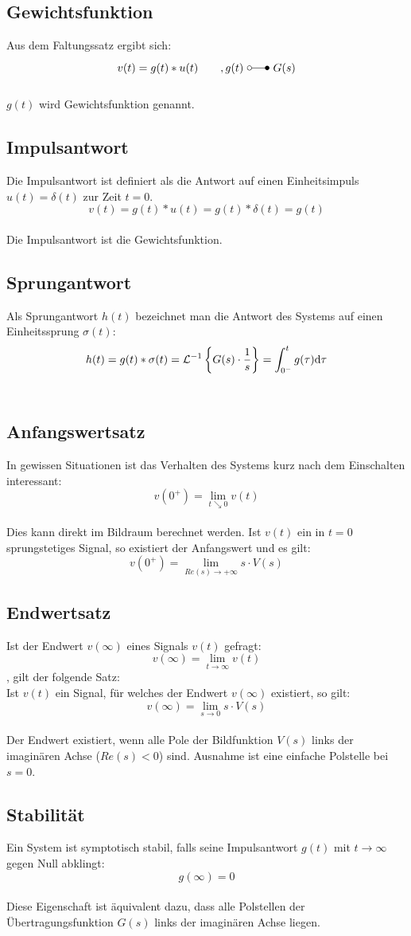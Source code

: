 \subsection{Gewichtsfunktion}
Aus dem Faltungssatz ergibt sich:
\[
	v(t) = g(t) \ast u(t) \qquad , g(t) \ \laplace \ G(s)
\]
\\
$g(t)$ wird Gewichtsfunktion genannt.
\\

\subsection{Impulsantwort}
Die Impulsantwort ist definiert als die Antwort auf einen Einheitsimpuls $u(t) = \delta(t)$ zur Zeit $t=0$.
\[
	v(t) = g(t) \ast u(t) = g(t) \ast \delta(t) = g(t)
\]
\\
Die Impulsantwort ist die Gewichtsfunktion.
\\

\subsection{Sprungantwort}
Als Sprungantwort $h(t)$ bezeichnet man die Antwort des Systems auf einen Einheitssprung $\sigma(t)$:
\[
	h(t) = g(t) \ast \sigma(t) = \mathcal{L}^{-1}\left\lbrace G(s) \cdot \frac{1}{s} \right\rbrace = \int_{0^-}^{t} g(\tau) \mathrm{d} \tau
\]
\\

\subsection{Anfangswertsatz}
In gewissen Situationen ist das Verhalten des Systems kurz nach dem Einschalten interessant:
\[
	v(0^+) = \lim\limits_{t \searrow 0}v(t)
\]
\\
Dies kann direkt im Bildraum berechnet werden. Ist $v(t)$ ein in $t=0$ sprungstetiges Signal, so existiert der Anfangswert und es gilt:
\[
	v(0^+) = \lim\limits_{Re(s)\rightarrow + \infty} s\cdot V(s)
\]

\subsection{Endwertsatz}
Ist der Endwert $v(\infty)$ eines Signals $v(t)$ gefragt:
\[
	v(\infty) = \lim\limits_{t \rightarrow \infty} v(t)
\]
, gilt der folgende Satz:\\
Ist $v(t)$ ein Signal, für welches der Endwert $v(\infty)$ existiert, so gilt:
\[
	v(\infty) = \lim\limits_{s \rightarrow 0} s \cdot V(s)
\]
\\
Der Endwert existiert, wenn alle Pole der Bildfunktion $V(s)$ links der imaginären Achse ($Re(s)<0$) sind. Ausnahme ist eine einfache Polstelle bei $s=0$.
\\

\subsection{Stabilität}
Ein System ist symptotisch stabil, falls seine Impulsantwort $g(t)$ mit $t \rightarrow \infty$ gegen Null abklingt:
\[
	g(\infty) = 0
\]
\\
Diese Eigenschaft ist äquivalent dazu, dass alle Polstellen der Übertragungsfunktion $G(s)$ links der imaginären Achse liegen.